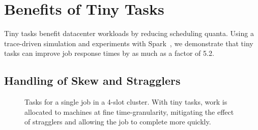 \section{Benefits of Tiny Tasks}

\label{sec:benefits}

Tiny tasks benefit datacenter workloads by reducing scheduling quanta. Using
a trace-driven simulation and experiments with Spark~\cite{zaharia2010spark},
we demonstrate that tiny tasks can improve job response times by
as much as a factor of 5.2.


\subsection{Handling of Skew and Stragglers}

\begin{figure}[t]
\centering
{}
\vspace{-0.1in}
\caption{Tasks for a single job in a 4-slot cluster.
With tiny tasks, work is allocated to machines at fine
time-granularity, mitigating the effect of stragglers and allowing
the job to complete more quickly.}
\vspace{-2ex}
\label{fig:tiny_diagram}
\end{figure}


